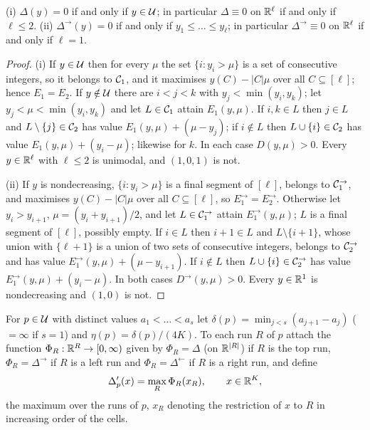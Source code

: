 \begin{lemma}\label{lem:S-zero}
(i) $\Delta(y)=0$ if and only if $y\in\mathcal{U}$; in particular $\Delta\equiv0$ on $\mathbb{R}^\ell$ if and only if $\ell\le2$.
(ii) $\Delta^{\to}(y)=0$ if and only if $y_1\le\dots\le y_\ell$; in particular $\Delta^{\to}\equiv0$ on $\mathbb{R}^\ell$ if and only if $\ell=1$.
\end{lemma}

\begin{proof}
(i) If $y\in\mathcal{U}$ then for every $\mu$ the set $\{i:y_i>\mu\}$ is a set of consecutive integers, so it belongs to $\mathcal{C}_1$, and it maximises $y(C)-|C|\mu$ over all $C\subseteq[\ell]$; hence $E_1=E_2$. If $y\notin\mathcal{U}$ there are $i<j<k$ with $y_j<\min(y_i,y_k)$; let $y_j<\mu<\min(y_i,y_k)$ and let $L\in\mathcal{C}_1$ attain $E_1(y,\mu)$. If $i,k\in L$ then $j\in L$ and $L\setminus\{j\}\in\mathcal{C}_2$ has value $E_1(y,\mu)+(\mu-y_j)$; if $i\notin L$ then $L\cup\{i\}\in\mathcal{C}_2$ has value $E_1(y,\mu)+(y_i-\mu)$; likewise for $k$. In each case $D(y,\mu)>0$. Every $y\in\mathbb{R}^\ell$ with $\ell\le2$ is unimodal, and $(1,0,1)$ is not.

(ii) If $y$ is nondecreasing, $\{i:y_i>\mu\}$ is a final segment of $[\ell]$, belongs to $\mathcal{C}^{\to}_1$, and maximises $y(C)-|C|\mu$ over all $C\subseteq[\ell]$, so $E^{\to}_1=E^{\to}_2$. Otherwise let $y_i>y_{i+1}$, $\mu=(y_i+y_{i+1})/2$, and let $L\in\mathcal{C}^{\to}_1$ attain $E^{\to}_1(y,\mu)$; $L$ is a final segment of $[\ell]$, possibly empty. If $i\in L$ then $i+1\in L$ and $L\setminus\{i+1\}$, whose union with $\{\ell+1\}$ is a union of two sets of consecutive integers, belongs to $\mathcal{C}^{\to}_2$ and has value $E^{\to}_1(y,\mu)+(\mu-y_{i+1})$. If $i\notin L$ then $L\cup\{i\}\in\mathcal{C}^{\to}_2$ has value $E^{\to}_1(y,\mu)+(y_i-\mu)$. In both cases $D^{\to}(y,\mu)>0$. Every $y\in\mathbb{R}^1$ is nondecreasing and $(1,0)$ is not.
\end{proof}

For $p\in\mathcal{U}$ with distinct values $a_1<\dots<a_s$ let $\delta(p)=\min_{j<s}(a_{j+1}-a_j)$ ($=\infty$ if $s=1$) and $\eta(p)=\delta(p)/(4K)$. To each run $R$ of $p$ attach the function $\Phi_R:\mathbb{R}^R\to[0,\infty)$ given by $\Phi_R=\Delta$ (on $\mathbb{R}^{|R|}$) if $R$ is the top run, $\Phi_R=\Delta^{\to}$ if $R$ is a left run and $\Phi_R=\Delta^{\leftarrow}$ if $R$ is a right run, and define
\begin{equation}\label{eq:supp-Dprime}
\Delta'_p(x)=\max_{R}\Phi_R(x_R),\qquad x\in\mathbb{R}^K,
\end{equation}
the maximum over the runs of $p$, $x_R$ denoting the restriction of $x$ to $R$ in increasing order of the cells.

